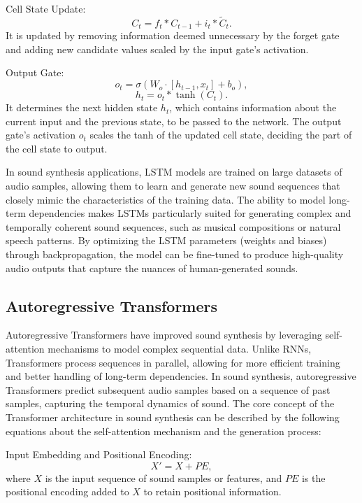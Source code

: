 \documentclass[11pt,a4paper,oneside]{report}
\begin{document}
Cell State Update:
\begin{equation}
C_t = f_t \ast C_{t-1} + i_t \ast \tilde{C}_t.
\end{equation}
It is updated by removing information deemed unnecessary by the forget gate and adding new candidate values scaled by the input gate's activation.

Output Gate:
\begin{equation}
o_t = \sigma(W_{o} \cdot [h_{t-1}, x_t] + b_o),
\end{equation}
\begin{equation}
h_t = o_t \ast \tanh(C_t).
\end{equation}
It determines the next hidden state $h_t$, which contains information about the current input and the previous state, to be passed to the network. The output gate's activation $o_t$ scales the tanh of the updated cell state, deciding the part of the cell state to output.

In sound synthesis applications, LSTM models are trained on large datasets of audio samples, allowing them to learn and generate new sound sequences that closely mimic the characteristics of the training data. The ability to model long-term dependencies makes LSTMs particularly suited for generating complex and temporally coherent sound sequences, such as musical compositions or natural speech patterns. By optimizing the LSTM parameters (weights and biases) through backpropagation, the model can be fine-tuned to produce high-quality audio outputs that capture the nuances of human-generated sounds.

\subsection{Autoregressive Transformers}

Autoregressive Transformers \cite{yan2021videogpt, wu2022nuwa} have improved sound synthesis by leveraging self-attention mechanisms to model complex sequential data. Unlike RNNs, Transformers process sequences in parallel, allowing for more efficient training and better handling of long-term dependencies. 
In sound synthesis, autoregressive Transformers predict subsequent audio samples based on a sequence of past samples, capturing the temporal dynamics of sound.
The core concept of the Transformer architecture in sound synthesis can be described by the following equations about the self-attention mechanism and the generation process:

Input Embedding and Positional Encoding:
\begin{equation}
X' = X + PE,
\end{equation}
where $X$ is the input sequence of sound samples or features, and $PE$ is the positional encoding added to $X$ to retain positional information.
\end{document}

